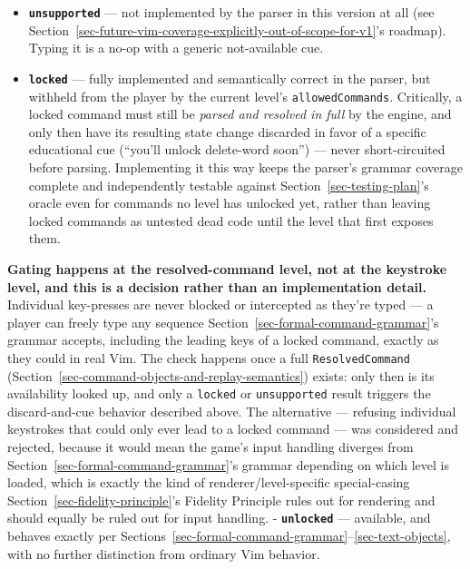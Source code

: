 \documentclass[11pt]{article}
\providecommand{\tightlist}{%
  \setlength{\itemsep}{0pt}\setlength{\parskip}{0pt}}
\begin{document}
\begin{itemize}
\tightlist
\item
  \textbf{\texttt{unsupported}} --- not implemented by the parser in this version at all
  (see Section~\ref{sec-future-vim-coverage-explicitly-out-of-scope-for-v1}'s roadmap). Typing it is a no-op with a generic
  not-available cue.
\item
  \textbf{\texttt{locked}} --- fully implemented and semantically correct in the parser,
  but withheld from the player by the current level's \texttt{allowedCommands}.
  Critically, a locked command must still be \emph{parsed and resolved in full}
  by the engine, and only then have its resulting state change discarded in
  favor of a specific educational cue (``you'll unlock delete-word soon'') ---
  never short-circuited before parsing. Implementing it this way keeps the
  parser's grammar coverage complete and independently testable against
  Section~\ref{sec-testing-plan}'s oracle even for commands no level has unlocked yet, rather
  than leaving locked commands as untested dead code until the level that
  first exposes them.
\end{itemize}

\textbf{Gating happens at the resolved-command level, not at the keystroke
level, and this is a decision rather than an implementation detail.}
Individual key-presses are never blocked or intercepted as they're typed ---
a player can freely type any sequence Section~\ref{sec-formal-command-grammar}'s grammar accepts,
including the leading keys of a locked command, exactly as they could in
real Vim. The check happens once a full \texttt{ResolvedCommand} (Section~\ref{sec-command-objects-and-replay-semantics})
exists: only then is its availability looked up, and only a \texttt{locked} or
\texttt{unsupported} result triggers the discard-and-cue behavior described above.
The alternative --- refusing individual keystrokes that could only ever lead
to a locked command --- was considered and rejected, because it would mean
the game's input handling diverges from Section~\ref{sec-formal-command-grammar}'s grammar depending on
which level is loaded, which is exactly the kind of renderer/level-specific
special-casing Section~\ref{sec-fidelity-principle}'s Fidelity Principle rules out for rendering and
should equally be ruled out for input handling.
- \textbf{\texttt{unlocked}} --- available, and behaves exactly per Sections~\ref{sec-formal-command-grammar}--\ref{sec-text-objects}, with no
further distinction from ordinary Vim behavior.
\end{document}
